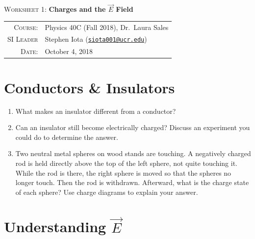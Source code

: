 \documentclass[12pt]{article}
\newcommand{\email}[1]{\texttt{\href{mailto:#1}{#1}}}
\begin{document}
\begin{center}

\Large{\textsc{Worksheet 1}: \textbf{Charges and the $\vec{E}$ Field}}

\end{center}

\vspace{.5mm}


\begin{tabular}{rl}

\textsc{Course}:
&
Physics 40C (Fall 2018), Dr.~Laura Sales
\\
\textsc{SI Leader}
&
Stephen Iota (\email{siota001@ucr.edu})
\\
\textsc{Date}:
&
October 4, 2018
\end{tabular}



\section{Conductors \& Insulators}

\begin{enumerate}[label=(\alph*)]

	\item What makes an insulator different from a conductor?
	\item Can an insulator still become electrically charged? Discuss an experiment you could do to determine the answer. 
	\item Two neutral metal spheres on wood stands are touching. A negatively charged rod is held directly above the top of the left sphere, not quite touching it. While the rod is there, the right sphere is moved so that the spheres no longer touch. Then the rod is withdrawn. Afterward, what is the charge state of each sphere? Use charge diagrams to explain your answer.
	
\end{enumerate}


\section{Understanding $\vec{E}$}
\end{document}
